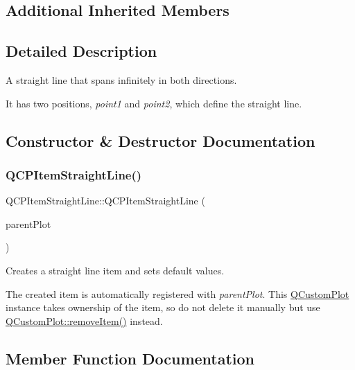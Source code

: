 \subsection*{Additional Inherited Members}


\subsection{Detailed Description}
A straight line that spans infinitely in both directions. 

 It has two positions, {\itshape point1} and {\itshape point2}, which define the straight line. 

\subsection{Constructor \& Destructor Documentation}
\mbox{\label{class_q_c_p_item_straight_line_a41fd2e1f006983449eca9830930c3b10}} 
\subsubsection{\texorpdfstring{Q\+C\+P\+Item\+Straight\+Line()}{QCPItemStraightLine()}}
{\footnotesize\ttfamily Q\+C\+P\+Item\+Straight\+Line\+::\+Q\+C\+P\+Item\+Straight\+Line (\begin{DoxyParamCaption}\item[{\hyperlink{class_q_custom_plot}{Q\+Custom\+Plot} $\ast$}]{parent\+Plot }\end{DoxyParamCaption})\hspace{0.3cm}{\ttfamily [explicit]}}

Creates a straight line item and sets default values.

The created item is automatically registered with {\itshape parent\+Plot}. This \hyperlink{class_q_custom_plot}{Q\+Custom\+Plot} instance takes ownership of the item, so do not delete it manually but use \hyperlink{class_q_custom_plot_ae04446557292551e8fb6e2c106e1848d}{Q\+Custom\+Plot\+::remove\+Item()} instead. 

\subsection{Member Function Documentation}
\mbox{\label{class_q_c_p_item_straight_line_a2e36c9d4dcc3aeda78a5584f790e39e3}} 
